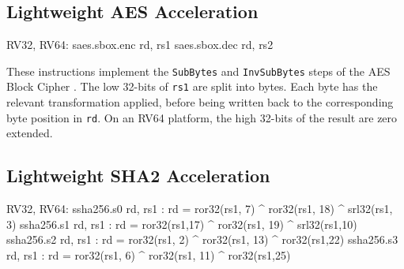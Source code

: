 

\subsection{Lightweight AES Acceleration}

\begin{isa}
RV32, RV64:
    saes.sbox.enc rd, rs1
    saes.sbox.dec rd, rs2
\end{isa}

These instructions implement the 
{\tt SubBytes} \cite[Section 5.1.1]{nist:fips:197}
and
{\tt InvSubBytes} \cite[Section 5.3.1]{nist:fips:197}
steps of the AES Block Cipher \cite{nist:fips:197}.
The low 32-bits of {\tt rs1} are split into bytes.
Each byte has the relevant transformation applied, before
being written back to the corresponding byte position in {\tt rd}.
On an RV64 platform, the high 32-bits of the result are zero
extended.





\subsection{Lightweight SHA2 Acceleration}

\begin{isa}
RV32, RV64:
    ssha256.s0 rd, rs1 : rd = ror32(rs1, 7) ^ ror32(rs1, 18) ^ srl32(rs1, 3)
    ssha256.s1 rd, rs1 : rd = ror32(rs1,17) ^ ror32(rs1, 19) ^ srl32(rs1,10)
    ssha256.s2 rd, rs1 : rd = ror32(rs1, 2) ^ ror32(rs1, 13) ^ ror32(rs1,22)
    ssha256.s3 rd, rs1 : rd = ror32(rs1, 6) ^ ror32(rs1, 11) ^ ror32(rs1,25)
\end{isa}

